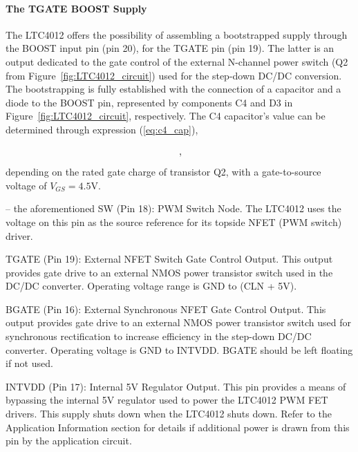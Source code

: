 
\paragraph{The TGATE BOOST Supply}	The LTC4012 offers the possibility of assembling a bootstrapped supply through the BOOST input pin (pin 20), for the TGATE pin (pin 19). The latter is an output dedicated to the gate control of the external N-channel power switch (Q2 from Figure~\ref{fig:LTC4012_circuit}) used for the step-down DC/DC conversion. The bootstrapping is fully established with the connection of a capacitor and a diode to the BOOST pin, represented by components C4 and D3 in Figure~\ref{fig:LTC4012_circuit}, respectively. The C4 capacitor's value can be determined through expression (\ref{eq:c4_cap}),

\begin{equation}\label{eq:c4_cap}
	\,,\medskip
\end{equation}
depending on the rated gate charge of transistor Q2, with a gate-to-source voltage of $V_{GS}=4.5$V.


-- the aforementioned 
SW (Pin 18): PWM Switch Node. The LTC4012 uses the
voltage on this pin as the source reference for its topside
NFET (PWM switch) driver.

TGATE (Pin 19): External NFET Switch Gate Control Output.
This output provides gate drive to an external NMOS power
transistor switch used in the DC/DC converter. Operating
voltage range is GND to (CLN + 5V).

BGATE (Pin 16): External Synchronous NFET Gate Control
Output. This output provides gate drive to an external NMOS
power transistor switch used for synchronous rectification
to increase efficiency in the step-down DC/DC converter.
Operating voltage is GND to INTVDD. BGATE should be
left floating if not used.

INTVDD (Pin 17): Internal 5V Regulator Output. This pin
provides a means of bypassing the internal 5V regulator
used to power the LTC4012 PWM FET drivers. This supply
shuts down when the LTC4012 shuts down. Refer to the
Application Information section for details if additional
power is drawn from this pin by the application circuit.

